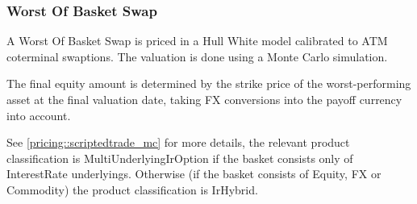 \subsubsection{Worst Of Basket Swap}
\label{pricing::worstofbasketswap}

A Worst Of Basket Swap is priced in a Hull White model calibrated to ATM coterminal swaptions.
The valuation is done using a Monte Carlo simulation.

The final equity amount is determined by the strike price of the worst-performing asset at the final
valuation date, taking FX conversions into the payoff currency into account.

See \ref{pricing::scriptedtrade_mc} for more details, the relevant product classification is MultiUnderlyingIrOption if
the basket consists only of InterestRate underlyings. Otherwise (if the basket consists of Equity, FX or Commodity) the
product classification is IrHybrid.
